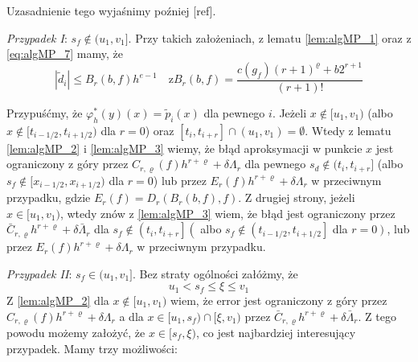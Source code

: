 \documentclass[oik, pdftex, robocza, man]{mgrwms}
\begin{document}
    Uzasadnienie tego wyjaśnimy poźniej [ref].

    \textit{Przypadek I}: $s_{f} \notin (u_{1}, v_{1}]$.
    Przy takich założeniach, z lematu \eqref{lem:algMP_1} oraz z \eqref{eq:algMP_7} mamy, że
    \begin{equation*}
        |\tilde{d}_{i}| \leq B_{r}(b, f) h^{e-1} \quad \text{z} B_{r}(b, f)=\frac{c\left(g_{f}\right)(r+1)^{\varrho}+b 2^{r+1}}{(r+1) !}
    \end{equation*}

    Przypuśćmy, że $\varphi_{h}^{*}(y)(x) = \tilde{p}_{i}(x)$ dla pewnego $i$. Jeżeli $x \notin [u_{1}, v_{1})$ (albo $x \notin [t_{i-1/2}, t_{i+1/2})$ dla $r=0$) oraz $[t_{i}, t_{i+r}] \cap (u_{1}, v_{1}) = \emptyset$. Wtedy z lematu \eqref{lem:algMP_2} i \eqref{lem:algMP_3} wiemy, że błąd aproksymacji w punkcie $x$ jest ograniczony z góry przez $C_{r,\varrho}(f)h^{r+\varrho} + \delta \Lambda_{r}$ dla pewnego $s_{d} \notin (t_{i}, t_{i+r}]$ (albo $s_{f} \notin [x_{i-1/2}, x_{i+1/2})$ dla $r=0$) lub przez $E_{r}(f)h^{r+\varrho} + \delta \Lambda_{r}$ w przeciwnym przypadku, gdzie $E_{r}(f) = D_{r}(B_{r}(b, f), f)$.
    Z drugiej strony, jeżeli $x \in [u_{1}, v_{1})$, wtedy znów z \eqref{lem:algMP_3} wiem, że błąd jest ograniczony przez $\bar{C}_{r, \varrho} h^{r+\varrho}+\delta \bar{\Lambda}_{r}$ dla $s_{f} \notin \left(t_{i}, t_{i+r}\right]\left(\right.$ albo $s_{f} \notin\left(t_{i-1 / 2}, t_{i+1 / 2}\right]$ dla $\left.r=0\right)$, lub przez $E_{r}(f) h^{r+\varrho}+\delta \Lambda_{r}$ w przeciwnym przypadku.

    \textit{Przypadek II}: $s_{f} \in (u_{1}, v_{1}]$.
    Bez straty ogólności załóżmy, że
    \begin{equation*}
        u_{1} < s_{f} \leq \xi \leq v_{1}
    \end{equation*}
    Z \eqref{lem:algMP_2} dla $x \notin [u_{1}, v_{1})$ wiem, że error jest ograniczony z góry przez $C_{r, \varrho}(f) h^{r+\varrho}+\delta \Lambda_{r}$ a dla $x \in [u_{1}, s_{f}) \cap [\xi, v_{1})$ przez $\bar{C}_{r, \varrho} h^{r+\varrho}+\delta \bar{\Lambda}_{r}$. Z tego powodu możemy założyć, że $x \in [s_{f}, \xi)$, co jest najbardziej interesujący przypadek. Mamy trzy możliwości:
\end{document}
